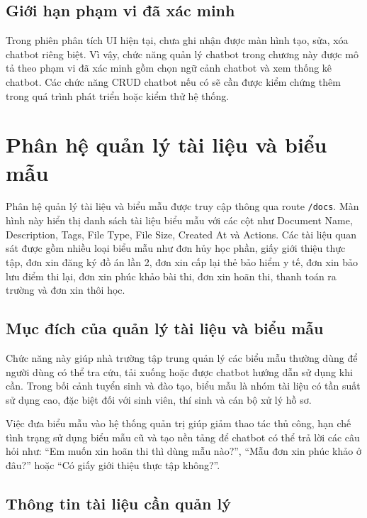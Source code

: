 \subsection{Giới hạn phạm vi đã xác minh}

Trong phiên phân tích UI hiện tại, chưa ghi nhận được màn hình tạo, sửa, xóa chatbot riêng biệt. Vì vậy, chức năng quản lý chatbot trong chương này được mô tả theo phạm vi đã xác minh gồm chọn ngữ cảnh chatbot và xem thống kê chatbot. Các chức năng CRUD chatbot nếu có sẽ cần được kiểm chứng thêm trong quá trình phát triển hoặc kiểm thử hệ thống.

\section{Phân hệ quản lý tài liệu và biểu mẫu}

Phân hệ quản lý tài liệu và biểu mẫu được truy cập thông qua route \texttt{/docs}. Màn hình này hiển thị danh sách tài liệu biểu mẫu với các cột như Document Name, Description, Tags, File Type, File Size, Created At và Actions. Các tài liệu quan sát được gồm nhiều loại biểu mẫu như đơn hủy học phần, giấy giới thiệu thực tập, đơn xin đăng ký đồ án lần 2, đơn xin cấp lại thẻ bảo hiểm y tế, đơn xin bảo lưu điểm thi lại, đơn xin phúc khảo bài thi, đơn xin hoãn thi, thanh toán ra trường và đơn xin thôi học.

\subsection{Mục đích của quản lý tài liệu và biểu mẫu}

Chức năng này giúp nhà trường tập trung quản lý các biểu mẫu thường dùng để người dùng có thể tra cứu, tải xuống hoặc được chatbot hướng dẫn sử dụng khi cần. Trong bối cảnh tuyển sinh và đào tạo, biểu mẫu là nhóm tài liệu có tần suất sử dụng cao, đặc biệt đối với sinh viên, thí sinh và cán bộ xử lý hồ sơ.

Việc đưa biểu mẫu vào hệ thống quản trị giúp giảm thao tác thủ công, hạn chế tình trạng sử dụng biểu mẫu cũ và tạo nền tảng để chatbot có thể trả lời các câu hỏi như: ``Em muốn xin hoãn thi thì dùng mẫu nào?'', ``Mẫu đơn xin phúc khảo ở đâu?'' hoặc ``Có giấy giới thiệu thực tập không?''.

\subsection{Thông tin tài liệu cần quản lý}


